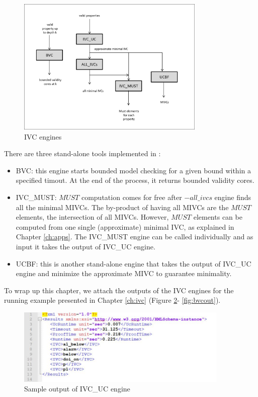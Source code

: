 \begin{figure}
  \centering
  \includegraphics[width=0.8\textwidth]{ivceng.png}
  \caption{\jkind IVC engines}
  \label{fig:ivcengines}
\end{figure}

\noindent There are three stand-alone tools implemented in \jkind:
\begin{itemize}
  \item BVC: this engine starts bounded model checking for a given bound within a specified timout. At the end of the process, it returns bounded validity cores.
  \item IVC\_MUST: $MUST$ computation comes for free after  $-all\_ivcs$ engine finds all the minimal MIVCs. The by-product of having all MIVCs are the $MUST$ elements, the intersection of all MIVCs. However, $MUST$ elements can be computed from one single (approximate) minimal IVC, as explained in Chapter \ref{ch:apps}. The IVC\_MUST engine can be called individually and as input it takes the output of IVC\_UC engine.
  \item UCBF: this is another stand-alone engine that takes the output of IVC\_UC engine and minimize the approximate MIVC to guarantee minimality.
\end{itemize}

To wrap up this chapter, we attach the outputs of the IVC engines for the running example presented in Chapter \ref{ch:ivc} (Figure \ref{fig:ucout}- \ref{fig:bvcout}).


\begin{figure}
  \centering
  \includegraphics[width=0.9\textwidth]{figs/ucout.jpg}
  \caption{Sample output of IVC\_UC engine}
  \label{fig:ucout}
\end{figure}

